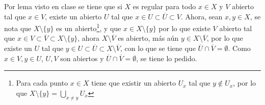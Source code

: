 \documentclass{homework}
\begin{document}
\begin{sol}
    Por lema visto en clase se tiene que si \(X\) es regular para todo \(x\in X\) y \(V\) abierto tal que \(x\in V\), existe un abierto \(U\) tal que \(x\in U\subset\overline{U}\subset V\). Ahora, sean \(x,y\in X\), se nota que \(X\setminus\{y\}\) es un abierto\footnote{Para cada punto \(x\in X\) tiene que existir un abierto \(U_x\) tal que \(y\notin U_x\), por lo que \(X\setminus\{y\}=\bigcup_{x\neq y}U_x\)}, y que \(x\in X\setminus\{y\}\) por lo que existe \(V\) abierto tal que \(x\in V\subset\overline{V}\subset X\setminus\{y\}\), ahora \(X\setminus\overline{V}\) es abierto, más aún \(y\in X\setminus\overline{V}\), por lo que existe un \(U\) tal que \(y\in U\subset\overline{U}\subset X\setminus\overline{V}\), con lo que se tiene que \(\overline{U}\cap\overline{V}=\emptyset\). Como \(x\in V, y\in U\), \(U,V\) son abiertos y \(\overline{U}\cap\overline{V}=\emptyset\), se tiene lo pedido.
\end{sol}
\end{document}
